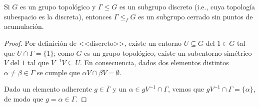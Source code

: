 \documentclass[teoria-numeros.tex]{subfiles}
\begin{document}
\addtocounter{thmi}{1}
\begin{slem}
	Si $G$ es un grupo topológico y $\Gamma \le G$ es un subgrupo discreto (i.e., cuya topología subespacio es la discreta),
	entonces $\Gamma \le_f G$ es un subgrupo cerrado sin puntos de acumulación.
\end{slem}
\begin{proof}
	Por definición de <<discreto>>, existe un entorno $U \subseteq G$ del $1 \in G$ tal que $U \cap \Gamma = \{ 1 \}$;
	como $G$ es un grupo topológico, existe un subentorno simétrico $V$ del $1$ tal que $V^{-1}V \subseteq U$.
	En consecuencia, dados dos elementos distintos $\alpha \ne \beta \in \Gamma$ se cumple que $\alpha V \cap \beta V = \emptyset$.
	
	Dado un elemento adherente $g \in \overline{\Gamma}$ y un $\alpha \in gV^{-1} \cap \Gamma$, vemos que $gV^{-1} \cap \Gamma = \{ \alpha \}$,
	de modo que $g = \alpha \in \Gamma$.
\end{proof}
\addtocounter{thmi}{-1}
\end{document}
